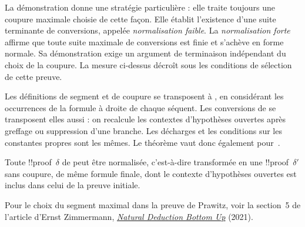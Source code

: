 \documentclass[../../../include/open-logic-section]{subfiles}
\begin{document}
La démonstration donne une stratégie
particulière : elle traite toujours une
coupure maximale choisie de cette façon.
Elle établit l'existence d'une suite
terminante de conversions, appelée
\emph{normalisation faible}.
La \emph{normalisation forte} affirme que toute suite maximale
de conversions est finie et s'achève en forme normale.
Sa démonstration exige un argument de terminaison indépendant
du choix de la coupure. La mesure ci-dessus décroît sous
les conditions de sélection de cette preuve.






Les définitions de segment et de coupure
se transposent à , en considérant
les occurrences de la formule à droite
de chaque séquent. Les conversions de
 se transposent elles aussi :
on recalcule les contextes d'hypothèses
ouvertes après greffage ou suppression
d'une branche. Les décharges et les
conditions sur les constantes propres
sont les mêmes. Le théorème vaut donc
également pour~.

\begin{thm}
Toute !!{proof}~$\delta$ de  peut
être normalisée, c'est-à-dire transformée
en une !!{proof}~$\delta'$ sans coupure,
de même formule finale, dont le contexte
d'hypothèses ouvertes est inclus dans
celui de la preuve initiale.
\end{thm}

Pour le choix du segment maximal dans la preuve de Prawitz, voir
la section~5 de l'article d'Ernst Zimmermann,
\href{https://doi.org/10.1007/s10849-021-09329-8}{\emph{Natural Deduction Bottom Up}} (2021).
\end{document}
